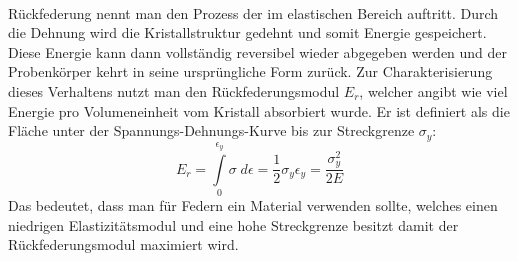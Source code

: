 \documentclass[11pt,a4paper]{article}
\numberwithin{equation}{section}
\numberwithin{figure}{section}
\begin{document}
\\
\begin{addmargin}[25pt]{0pt}
Rückfederung nennt man den Prozess der im elastischen Bereich auftritt. Durch die Dehnung wird die Kristallstruktur gedehnt und somit Energie gespeichert. Diese Energie kann dann vollständig reversibel wieder abgegeben werden und der Probenkörper kehrt in seine ursprüngliche Form zurück. Zur Charakterisierung dieses Verhaltens nutzt man den Rückfederungsmodul $E_r$, welcher angibt wie viel Energie pro Volumeneinheit vom Kristall absorbiert wurde. Er ist definiert als die Fläche unter der Spannungs-Dehnungs-Kurve bis zur Streckgrenze $\sigma_y$: 
\begin{equation}\label{eq:Rückfederungsmodul}
    E_r = \int\limits_0^{\epsilon_y}\sigma\; \si{d}\epsilon = \frac{1}{2}\sigma_y\epsilon_y = \frac{\sigma_y^2}{2E}
\end{equation}
Das bedeutet, dass man für Federn ein Material verwenden sollte, welches einen niedrigen Elastizitätsmodul und eine hohe Streckgrenze besitzt damit der Rückfederungsmodul maximiert wird.\\
\end{addmargin}
\end{document}
